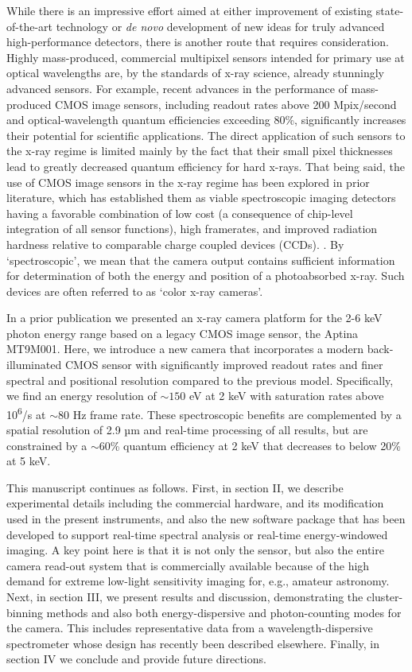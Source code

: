 While there is an impressive effort aimed at either improvement of
existing state-of-the-art technology or \emph{de novo} development of
new ideas for truly advanced high-performance detectors, there is
another route that requires consideration. Highly mass-produced,
commercial multipixel sensors intended for primary use at optical
wavelengths are, by the standards of x-ray science, already stunningly
advanced sensors. For example, recent advances in the performance of
mass-produced CMOS image sensors, including readout rates above 200
Mpix/second and optical-wavelength quantum efficiencies exceeding 80\%,
significantly increases their potential for scientific applications. The
direct application of such sensors to the x-ray regime is limited mainly
by the fact that their small pixel thicknesses lead to greatly decreased
quantum efficiency for hard x-rays. That being said, the use of CMOS
image sensors in the x-ray regime has been explored in prior literature,
which has established them as viable spectroscopic imaging detectors
having a favorable combination of low cost (a consequence of chip-level
integration of all sensor functions), high framerates, and improved
radiation hardness relative to comparable charge coupled devices (CCDs).
\cite{servoli2010characterization, lane2012x, nachtrab2009simple, hoidn2015note}. By `spectroscopic', we mean that the camera
output contains sufficient information for determination of both the
energy and position of a photoabsorbed x-ray. Such devices are often
referred to as `color x-ray cameras'.

In a prior publication we presented an x-ray camera platform for the 2-6
keV photon energy range based on a legacy CMOS image sensor, the Aptina
MT9M001. Here, we introduce a new camera that incorporates a modern
back-illuminated CMOS sensor with significantly improved readout rates
and finer spectral and positional resolution compared to the previous
model. Specifically, we find an energy resolution of
$\sim150$ eV at 2 keV with saturation rates above
10\textsuperscript{6}/s at $\sim80$ Hz frame rate. These
spectroscopic benefits are complemented by a spatial resolution of 2.9
µm and real-time processing of all results, but are constrained by a
$\sim60$\% quantum efficiency at 2 keV that decreases to
below 20\% at 5 keV.

This manuscript continues as follows. First, in section II, we describe
experimental details including the commercial hardware, and its
modification used in the present instruments, and also the new software
package that has been developed to support real-time spectral analysis
or real-time energy-windowed imaging. A key point here is that it is not
only the sensor, but also the entire camera read-out system that is
commercially available because of the high demand for extreme low-light
sensitivity imaging for, e.g., amateur astronomy. Next, in section III,
we present results and discussion, demonstrating the cluster-binning
methods and also both energy-dispersive and photon-counting modes for
the camera. This includes representative data from a
wavelength-dispersive spectrometer whose design has recently been
described elsewhere. \cite{holden2017compact} Finally, in section IV we
conclude and provide future directions.

